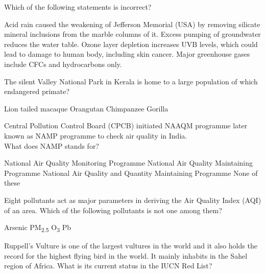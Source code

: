 \begin{questions}
    \question Which of the following statements is incorrect?

    \begin{randomizechoices}
        \choice Acid rain caused the weakening of Jefferson Memorial (USA) by removing silicate mineral inclusions from the marble columns of it.
        \choice Excess pumping of groundwater reduces the water table.
        \choice Ozone layer depletion increases UVB levels, which could lead to damage to human body, including skin cancer.
        \CorrectChoice Major greenhouse gases include CFCs and hydrocarbons only.
    \end{randomizechoices}

    \question The silent Valley National Park in Kerala is home to a large population of which endangered primate?

    \begin{randomizeoneparchoices}
        \CorrectChoice Lion tailed macaque
        \choice Orangutan
        \choice Chimpanzee
        \choice Gorilla
    \end{randomizeoneparchoices}

    \question Central Pollution Control Board (CPCB) initiated NAAQM programme later known as NAMP programme to check air quality in India. \\ What does NAMP stands for?

    \begin{randomizechoices}
        \CorrectChoice National Air Quality Monitoring Programme
        \choice National Air Quality Maintaining Programme
        \choice National Air Quality and Quantity Maintaining Programme
        \choice None of these
    \end{randomizechoices}

    \question Eight pollutants act as major parameters in deriving the Air Quality Index (AQI) of an area. Which of the following pollutants is not one among them?

    \begin{randomizeoneparchoices}
        \CorrectChoice Arsenic
        \choice PM\textsubscript{2.5}
        \choice O\textsubscript{3}
        \choice Pb
    \end{randomizeoneparchoices}

    \question Ruppell's Vulture is one of the largest vultures in the world and it also holds the record for the highest flying bird in the world. It mainly inhabits in the Sahel region of Africa. What is its current status in the IUCN Red List?


\end{questions}
